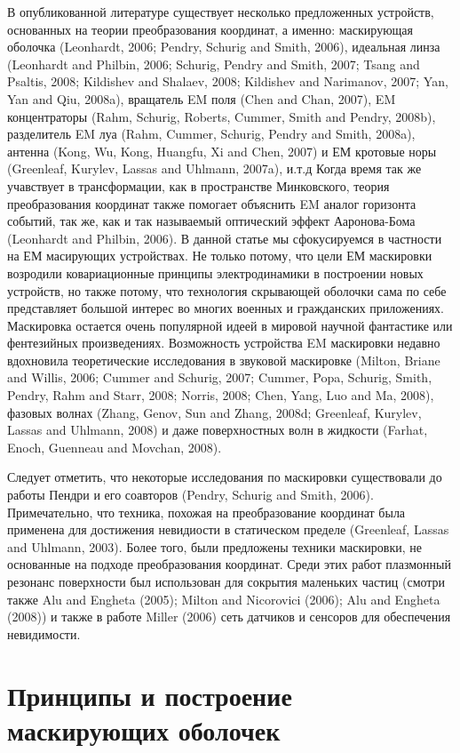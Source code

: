 \documentclass[12pt,a4paper]{article}
\begin{document}
В опубликованной литературе существует несколько предложенных устройств, основанных на теории 
преобразования координат, а именно: маскирующая оболочка (Leonhardt, 2006; Pendry, Schurig and Smith, 
2006), идеальная линза (Leonhardt and Philbin, 2006; Schurig, Pendry and Smith, 2007; Tsang and Psaltis, 
2008; Kildishev and Shalaev, 2008; Kildishev and Narimanov, 2007; Yan, Yan and Qiu, 2008a), вращатель EM 
поля (Chen and Chan, 2007), EM концентраторы (Rahm, Schurig, Roberts, Cummer, Smith and Pendry, 2008b),
разделитель EM луа (Rahm, Cummer, Schurig, Pendry and Smith, 2008a), антенна (Kong, Wu, Kong, Huangfu, 
Xi and Chen, 2007) и ЕМ кротовые норы (Greenleaf, Kurylev, Lassas and Uhlmann, 2007a), и.т.д
Когда время так же учавствует в трансформации, как в пространстве Минковского, теория преобразования
координат также помогает объяснить EM аналог горизонта событий, так же, как и так называемый оптический
эффект Ааронова-Бома (Leonhardt and Philbin, 2006). В данной статье мы сфокусируемся в частности на ЕМ
масирующих устройствах. Не только потому, что цели ЕМ маскировки возродили ковариационные принципы
электродинамики в построении новых устройств, но также потому, что технология скрывающей оболочки сама
по себе представляет большой интерес во многих военных и гражданских приложениях. Маскировка остается
очень популярной идеей в мировой научной фантастике или фентезийных произведениях. Возможность устройства
EM маскировки недавно вдохновила теоретические исследования в звуковой маскировке (Milton, Briane and 
Willis, 2006; Cummer and Schurig, 2007; Cummer, Popa, Schurig, Smith, Pendry, Rahm and Starr, 2008; 
Norris, 2008; Chen, Yang, Luo and Ma, 2008), фазовых волнах (Zhang, Genov, Sun and Zhang, 2008d; 
Greenleaf, Kurylev, Lassas and Uhlmann, 2008) и даже поверхностных волн в жидкости (Farhat, Enoch, 
Guenneau and Movchan, 2008). 

Следует отметить, что некоторые исследования по маскировки существовали до работы Пендри и его соавторов
(Pendry, Schurig and Smith, 2006). Примечательно, что техника, похожая на преобразование координат была
применена для достижения невидиости в статическом пределе (Greenleaf, Lassas and Uhlmann, 2003). Более
того, были предложены техники маскировки, не основанные на подходе преобразования координат. Среди этих
работ плазмонный резонанс поверхности был использован для сокрытия маленьких частиц (смотри также Alu
and Engheta (2005); Milton and Nicorovici (2006); Alu and Engheta (2008)) и также в работе Miller (2006) 
сеть датчиков и сенсоров для обеспечения невидимости.

\section{Принципы и построение маскирующих оболочек}
\end{document}
